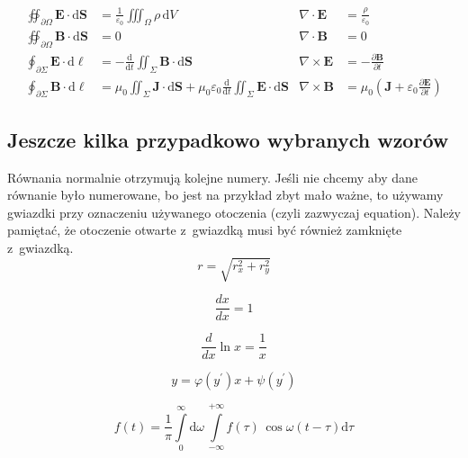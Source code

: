 \begin{align}
\oiint\nolimits_{\partial \Omega} \pmb{E} \cdot \mathrm{d}\pmb{S} &= \frac{1}{\varepsilon_0} \iiint\nolimits_\Omega \rho \, \mathrm{d}V &  \nabla \cdot \pmb{E} &= \frac {\rho} {\varepsilon_0} \label{eq:maxwell1} \\
\oiint\nolimits_{\partial \Omega} \pmb{B} \cdot \mathrm{d}\pmb{S} &= 0 & \nabla \cdot \pmb{B} &= 0 \label{eq:maxwell2} \\
\oint\nolimits_{\partial \Sigma} \pmb{E} \cdot \mathrm{d}\boldsymbol{\ell} &= -\frac{\mathrm{d}}{\mathrm{d}t}\iint\nolimits_{\Sigma}\pmb{B}\cdot\mathrm{d}\pmb{S} & \nabla \times \pmb{E} &= -\frac{\partial \pmb{B}}{\partial t} \label{eq:maxwell3} \\
\oint\nolimits_{\partial \Sigma} \pmb{B} \cdot \mathrm{d}\boldsymbol{\ell} &= \mu_0 \iint\nolimits_{\Sigma} \pmb{J} \cdot \mathrm{d}\pmb{S} + \mu_0 \varepsilon_0 \frac{\mathrm{d}}{\mathrm{d}t} \iint\nolimits_{\Sigma} \pmb{E} \cdot \mathrm{d}\pmb{S} & \nabla \times \pmb{B} &= \mu_0\left(\pmb{J} + \varepsilon_0 \frac{\partial \pmb{E}} {\partial t} \right) \label{eq:maxwell4}
\end{align}


\subsection{Jeszcze kilka przypadkowo wybranych wzorów}
Równania normalnie otrzymują kolejne numery. Jeśli nie chcemy aby dane równanie było numerowane, bo jest na przykład zbyt mało ważne, to używamy gwiazdki przy oznaczeniu używanego otoczenia (czyli zazwyczaj equation). Należy pamiętać, że otoczenie otwarte z~gwiazdką musi być również zamknięte z~gwiazdką.
\begin{equation*}
    r = \sqrt{r_x^2 + r_y^2}
\end{equation*}

\begin{equation}
    \frac{dx}{dx} = 1
\end{equation}

\begin{equation}
    \frac{d}{dx} \ln x = \frac{1}{x}
\end{equation}

\begin{equation}
    y = \varphi  (y^\prime)x + \psi(y^\prime)
\end{equation}

\begin{equation}
    f(t) = \frac{1}{\pi} \int\limits_0^\infty \mathrm{d} \omega \,\int\limits_{-\infty}^{+\infty} f(\tau)\, \cos \omega (t-\tau)  \mathrm{d}\tau
\end{equation}

